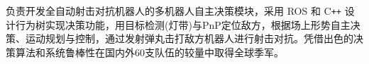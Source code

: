 \documentclass{resume}
\begin{document}
\begin{onehalfspacing}
负责开发全自动射击对抗机器人的多机器人自主决策模块，采用 ROS 和 C\texttt{++} 设计行为树实现决策功能，用目标检测(灯带)与PnP定位敌方，根据场上形势自主决策、运动规划与控制，通过发射弹丸击打敌方机器人进行射击对抗。凭借出色的决策算法和系统鲁棒性在国内外60支队伍的较量中取得全球季军。
\end{onehalfspacing}
\end{document}
